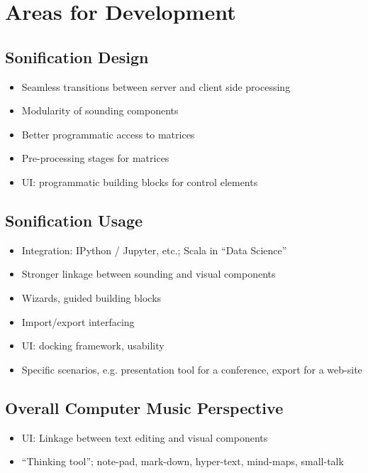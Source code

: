 \documentclass[11pt,a4paper]{article}
\begin{document}
\section{Areas for Development}

\subsection{Sonification Design}

\begin{itemize}
\item Seamless transitions between server and client side processing
\item Modularity of sounding components
\item Better programmatic access to matrices
\item Pre-processing stages for matrices
\item UI: programmatic building blocks for control elements
\end{itemize}

\subsection{Sonification Usage}

\begin{itemize}
\item Integration: IPython / Jupyter, etc.; Scala in ``Data Science''
\item Stronger linkage between sounding and visual components
\item Wizards, guided building blocks
\item Import/export interfacing
\item UI: docking framework, usability
\item Specific scenarios, e.g. presentation tool for a conference, export for a web-site
\end{itemize}

\subsection{Overall Computer Music Perspective}

\begin{itemize}
\item UI: Linkage between text editing and visual components
\item ``Thinking tool''; note-pad, mark-down, hyper-text, mind-maps, small-talk
\end{itemize}
\end{document}
